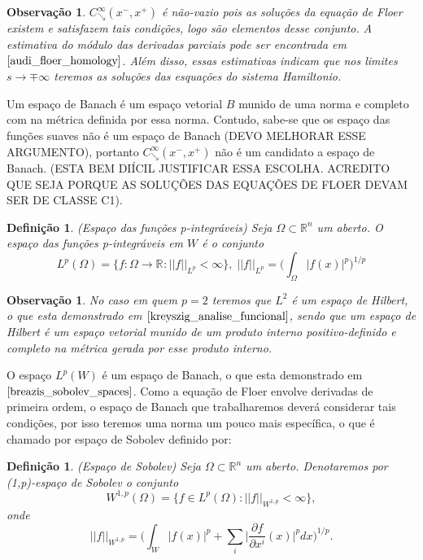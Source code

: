 \documentclass[12pt]{book}
\newtheorem{definicao}[teorema]{Definição}
\newtheorem{observacao}[teorema]{Observação}
\newcommand{\caminhosdecaimentoexponencial}[2]{C^{\infty}_{\searrow}(#1, #2)}
\newcommand{\caminhosdecaimentoexponencialpadrao}{\caminhosdecaimentoexponencial{x^{-}}{x^{+}}}
\newcommand{\derivadaparcial}[2]{\frac{\partial #1}{\partial #2}}
\newcommand{\normaLp}[1]{||#1||_{L^{p}}}
\newcommand{\normaLpdefinicao}[2]{ \Big(\int_{#2}#1^{p}\Big)^{1/p}}
\newcommand{\normaWp}[1]{||#1||_{W^{1,p}}}
\newcommand{\real}[1]{\mathbb{R}^{#1}}
\newcommand{\vermelho}[1]{{\color{red}#1}}
\begin{document}
	\begin{observacao}
		$\caminhosdecaimentoexponencialpadrao$ é não-vazio pois as soluções da equação de Floer existem e satisfazem tais condições, logo são elementos desse conjunto. A estimativa do módulo das derivadas parciais pode ser encontrada em $\cite{audi_floer_homology}$. Além disso, essas estimativas indicam que nos limites $s\to \mp \infty$ teremos as soluções das esquações do sistema Hamiltonio.
	\end{observacao}
	
	Um espaço de Banach é um espaço vetorial $B$ munido de uma norma e completo com na métrica definida por essa norma. Contudo, sabe-se que os espaço das funções suaves não é um espaço de Banach \vermelho{(DEVO MELHORAR ESSE ARGUMENTO)}, portanto $\caminhosdecaimentoexponencialpadrao$ não é um candidato a espaço de Banach. \vermelho{(ESTA BEM DIÍCIL JUSTIFICAR ESSA ESCOLHA. ACREDITO QUE SEJA PORQUE AS SOLUÇÕES DAS EQUAÇÕES DE FLOER DEVAM SER DE CLASSE C1).}
	
	\begin{definicao}
		(Espaço das funções p-integráveis) Seja $\Omega\subset \real{n}$ um aberto. O espaço das funções p-integráveis em $W$ é o conjunto 
		$$
		L^{p}(\Omega) = \{f:\Omega \to \real{} : \normaLp{f} < \infty \}, \; \normaLp{f} = \normaLpdefinicao{|f(x)|}{\Omega}
		$$
	\end{definicao}
	
	\begin{observacao}
		No caso em quem $p=2$ teremos que $L^{2}$ é um espaço de Hilbert, o que esta demonstrado em $\cite{kreyszig_analise_funcional}$, sendo que um espaço de Hilbert é um espaço vetorial munido de um produto interno positivo-definido e completo na métrica gerada por esse produto interno.
	\end{observacao}
	
	O espaço $L^{p}(W)$ é um espaço de Banach, o que esta demonstrado em $\cite{breazis_sobolev_spaces}$. Como a equação de Floer envolve derivadas de primeira ordem, o espaço de Banach que trabalharemos deverá considerar tais condições, por isso teremos uma norma um pouco mais específica, o que é chamado por espaço de Sobolev definido por:
	
	\begin{definicao}
		(Espaço de Sobolev)  Seja $\Omega \subset \real{n}$ um aberto. Denotaremos por (1,p)-espaço de Sobolev o conjunto
		$$
		W^{1,p}(\Omega) = \{f \in L^{p}(\Omega) : \normaWp{f} <\infty  \},
		$$
		onde 
		$$
		\normaWp{f} = \Big(\int_{W}|f(x)|^{p} + \sum_{i} \Big|\derivadaparcial{f}{x^{i}}(x)\Big|^{p}dx\Big)^{1/p}.
		$$
	\end{definicao}
	
\end{document}
